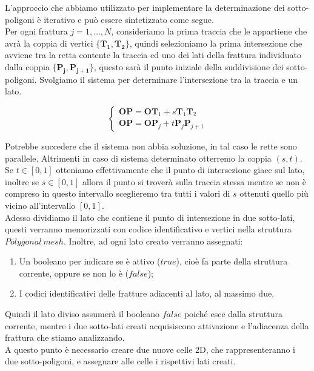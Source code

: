 \documentclass[a4paper]{article}
\newcommand{\B}{\mathbf}
\begin{document}
L'approccio che abbiamo utilizzato per implementare la determinazione dei sotto-poligoni è iterativo e può essere sintetizzato come segue.  \\ [2mm] Per ogni frattura $j=1,\dots,N$, consideriamo la prima traccia che le appartiene che avrà la coppia di vertici $\{\B{T_{1}},\B{T_{2}}\}$, quindi selezioniamo la prima intersezione che avviene tra la retta contente la traccia ed uno dei lati della frattura individuato dalla coppia $\{\B{P_{j}},\B{P_{j+1}}\}$, questo sarà il punto iniziale della suddivisione dei sotto-poligoni. Svolgiamo il sistema per determinare l'intersezione tra la traccia e un lato.

\begin{equation}
\begin{cases}
\B{OP}=\B{OT}_1+s\B{T}_1\B{T}_{2} \\ 
\B{OP}=\B{OP}_j+t\B{P}_j\B{P}_{j+1}
\end{cases}
\label{eq:intersezioni}
\end{equation}

Potrebbe succedere che il sistema non abbia soluzione, in tal caso le rette sono parallele. Altrimenti in caso di sistema determinato otterremo la coppia $( s,t )$. Se $t \in [0,1]$ otteniamo effettivamente che il punto di intersezione giace sul lato, inoltre se $s \in [0,1]$ allora il punto si troverà sulla traccia stessa mentre se non è compreso in questo intervallo sceglieremo tra tutti i valori di $s$ ottenuti quello più vicino all'intervallo $[0,1]$. \\

Adesso dividiamo il lato che contiene il punto di intersezione in due sotto-lati, questi verranno memorizzati con codice identificativo e vertici nella struttura $Polygonal \ mesh$. Inoltre, ad ogni lato creato verranno assegnati: 
\begin{enumerate} 
\item Un booleano per indicare se è attivo ($true$), cioè fa parte della struttura corrente, oppure se non lo è ($false$);
\item I codici identificativi delle fratture adiacenti al lato, al massimo due.
\end{enumerate}

Quindi il lato diviso assumerà il booleano $false$ poiché esce dalla struttura corrente, mentre i due sotto-lati creati acquisiscono attivazione e l'adiacenza della frattura che stiamo analizzando. \\[2mm]
A questo punto è necessario creare due nuove celle 2D, che rappresenteranno i due sotto-poligoni, e assegnare alle celle i rispettivi lati creati. 
\end{document}
